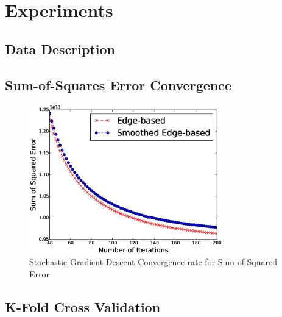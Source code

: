 \documentclass{sig-alternate}
\begin{document}
\section{Experiments}
\label{sec:experiments}

\subsection{Data Description}

\subsection{Sum-of-Squares Error Convergence}

\begin{figure}[htb]
	\centering
	\includegraphics[width=3.3in]{convergence}
	\caption{Stochastic Gradient Descent Convergence rate for Sum of Squared Error}
	\label{fig:convergence}
\end{figure}

\subsection{K-Fold Cross Validation}
\end{document}
